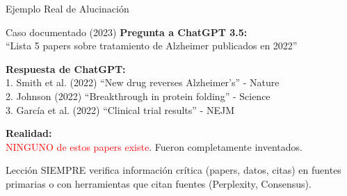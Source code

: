 \documentclass[aspectratio=169,xcolor={dvipsnames}]{beamer}
\begin{document}
	\begin{frame}{Ejemplo Real de Alucinación}
		
		\begin{exampleblock}{Caso documentado (2023)}
			\textbf{Pregunta a ChatGPT 3.5:}\\
			``Lista 5 papers sobre tratamiento de Alzheimer publicados en 2022''
			
			\vspace{0.3cm}
			
			\textbf{Respuesta de ChatGPT:}\\
			\small
			1. Smith et al. (2022) ``New drug reverses Alzheimer's'' - Nature\\
			2. Johnson (2022) ``Breakthrough in protein folding'' - Science\\
			3. García et al. (2022) ``Clinical trial results'' - NEJM\\
			[...]
			
			\vspace{0.3cm}
			
			\textbf{Realidad:}\\
			\textcolor{red}{NINGUNO de estos papers existe}. Fueron completamente inventados.
		\end{exampleblock}
		
		\vspace{0.3cm}
		
		\begin{alertblock}{Lección}
			SIEMPRE verifica información crítica (papers, datos, citas) en fuentes primarias o con herramientas que citan fuentes (Perplexity, Consensus).
		\end{alertblock}
		
	\end{frame}
	
\end{document}
